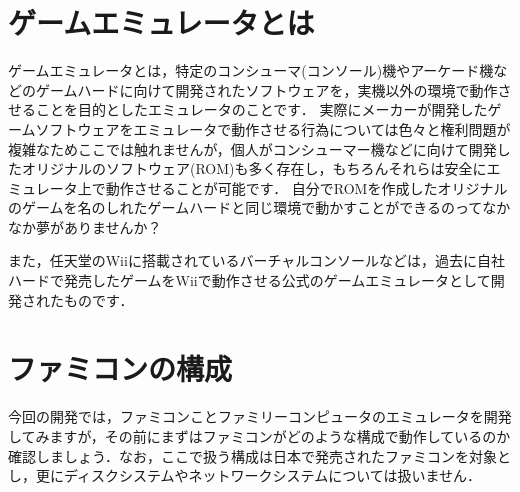 \section{ゲームエミュレータとは}
ゲームエミュレータとは，特定のコンシューマ(コンソール)機やアーケード機などのゲームハードに向けて開発されたソフトウェアを，実機以外の環境で動作させることを目的としたエミュレータのことです．
実際にメーカーが開発したゲームソフトウェアをエミュレータで動作させる行為については色々と権利問題が複雑なためここでは触れませんが，個人がコンシューマー機などに向けて開発したオリジナルのソフトウェア(ROM)も多く存在し，もちろんそれらは安全にエミュレータ上で動作させることが可能です．
自分でROMを作成したオリジナルのゲームを名のしれたゲームハードと同じ環境で動かすことができるのってなかなか夢がありませんか？

また，任天堂のWiiに搭載されているバーチャルコンソールなどは，過去に自社ハードで発売したゲームをWiiで動作させる公式のゲームエミュレータとして開発されたものです．

\section{ファミコンの構成}
今回の開発では，ファミコンことファミリーコンピュータのエミュレータを開発してみますが，その前にまずはファミコンがどのような構成で動作しているのか確認しましょう．なお，ここで扱う構成は日本で発売されたファミコンを対象とし，更にディスクシステムやネットワークシステムについては扱いません．

